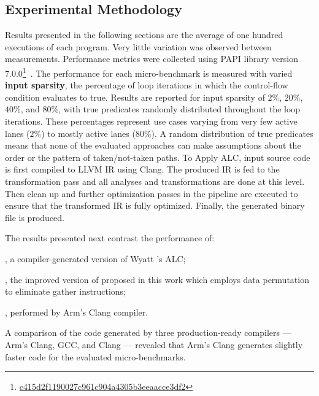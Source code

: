 \subsection{Experimental Methodology}
\label{sec:methodology}

Results presented in the following sections are the average of one hundred executions of each program.
Very little variation was observed between measurements.
Performance metrics were collected using PAPI library version $7.0.0$\footnote{\href{https://bitbucket.org/icl/papi/commits/c415d2f1190027c961c904a4305b3eeaacce3df2}{c415d2f1190027c961c904a4305b3eeaacce3df2}}~\cite{papi}.
The performance for each micro-benchmark is measured with varied \textbf{input sparsity}, the percentage of loop iterations in which the control-flow condition evaluates to true.
Results are reported for input sparsity of $2\%$, $20\%$, $40\%$, and $80\%$, with true predicates randomly distributed throughout the loop iterations.
These percentages represent use cases varying from very few active lanes ($2\%$) to mostly active lanes ($80\%$).
A random distribution of true predicates means that none of the evaluated approaches can make assumptions about the order or the pattern of taken/not-taken paths.
To Apply ALC, input source code is first compiled to LLVM IR using Clang. The  produced IR is fed to the transformation pass and all analyses and transformations are done at this level. Then clean up and further optimization passes in the  pipeline are executed to ensure that the transformed IR is fully optimized. 
Finally, the generated binary file is produced.

The results presented next contrast the performance of:
\begin{inparaenum}[(i)]
  \item \textbf{\ALC}, a compiler-generated version of Wyatt \etal's ALC;
  \item \textbf{\ALCdp}, the improved version of \ALC proposed in this work which employs data permutation to eliminate gather instructions;
  \item \textbf{\ifconv}, \ifconversion performed by Arm's Clang compiler.
\end{inparaenum}
A comparison of the \ifconversion code generated by three production-ready compilers --- Arm's Clang, GCC, and Clang --- revealed that Arm's Clang generates slightly faster code for the evaluated micro-benchmarks.


